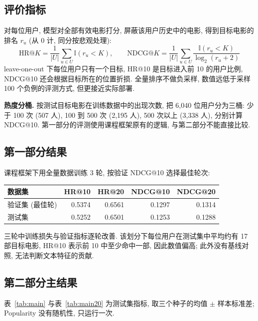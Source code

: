 \documentclass{article}
\begin{document}
\subsection{评价指标}

对每位用户, 模型对全部有效电影打分, 屏蔽该用户历史中的电影, 得到目标电影的排名 $r_u$ (从 0 计, 同分按悲观处理):
\[
\mathrm{HR@}K = \frac{1}{|U|}\sum_{u\in U}\mathbb{I}(r_u < K),\qquad
\mathrm{NDCG@}K = \frac{1}{|U|}\sum_{u\in U}\frac{\mathbb{I}(r_u < K)}{\log_2(r_u+2)}
\]
leave-one-out 下每位用户只有一个目标, HR@10 是目标进入前 10 的用户比例, NDCG@10 还会根据目标所在的位置折损. 全量排序不做负采样, 数值远低于采样 100 个负例的评测方式, 但更接近实际部署.

\textbf{热度分桶.} 按测试目标电影在训练数据中的出现次数, 把 6,040 位用户分为三桶: 少于 100 次 (507 人), 100 到 500 次 (2,195 人), 500 次以上 (3,338 人), 分别计算 NDCG@10. 第一部分的评测使用课程框架原有的逻辑, 与第二部分不能直接比较.

\subsection{第一部分结果}

课程框架下用全量数据训练 3 轮, 按验证 NDCG@10 选择最佳轮次:

\begin{center}
\small
\begin{tabular}{lrrrr}
\toprule
数据集 & HR@10 & HR@20 & NDCG@10 & NDCG@20 \\
\midrule
验证集 (最佳轮) & 0.5374 & 0.6561 & 0.1297 & 0.1314 \\
测试集 & 0.5252 & 0.6501 & 0.1253 & 0.1288 \\
\bottomrule
\end{tabular}
\end{center}

三轮中训练损失与验证指标逐轮改善. 该划分下每位用户在测试集中平均约有 17 部目标电影, HR@10 表示前 10 中至少命中一部, 因此数值偏高; 此外没有基线对照, 无法判断文本特征的贡献.

\subsection{第二部分主结果}

表~\ref{tab:main} 与表~\ref{tab:main20} 为测试集指标, 取三个种子的均值 $\pm$ 样本标准差; Popularity 没有随机性, 只运行一次.
\end{document}
